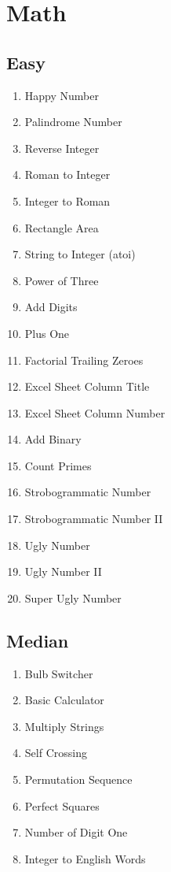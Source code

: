 \documentclass[DIV=calc, paper=a4, fontsize=11pt, twocolumn]{scrartcl}	 %
\begin{document}

\section*{Math}

\subsection*{Easy}
\begin{enumerate}
\item Happy Number    \cite{202}
\item Palindrome Number \cite{009}
\item Reverse Integer \cite{007}
\item Roman to Integer   \cite{013}
\item Integer to Roman \cite{012}
\item Rectangle Area \cite{223}
\item String to Integer (atoi) \cite{008}
\item Power of Three   \cite{326}
\item {\color{red} Add Digits}   \cite{258}
\item Plus One    \cite{066}
\item Factorial Trailing Zeroes   \cite{172}
\item Excel Sheet Column Title    \cite{168}
\item Excel Sheet Column Number   \cite{171}
\item Add Binary \cite{067}
\item Count Primes   \cite{204}
\item Strobogrammatic Number \cite{246}
\item Strobogrammatic Number II  \cite{247}
\item Ugly Number    \cite{263}
\item {\color{red} Ugly Number II}    \cite{264}
\item {\color{red} Super Ugly Number} \cite{313}
\end{enumerate}

\subsection*{Median}
\begin{enumerate}
\item Bulb Switcher   \cite{319}
\item Basic Calculator    \cite{224}
\item Multiply Strings   \cite{043}
\item Self Crossing  \cite{335}
\item {\color{red} Permutation Sequence}  \cite{060}
\item Perfect Squares   \cite{279}
\item Number of Digit One   \cite{233}
\item Integer to English Words \cite{273}
\end{enumerate}
\end{document}

